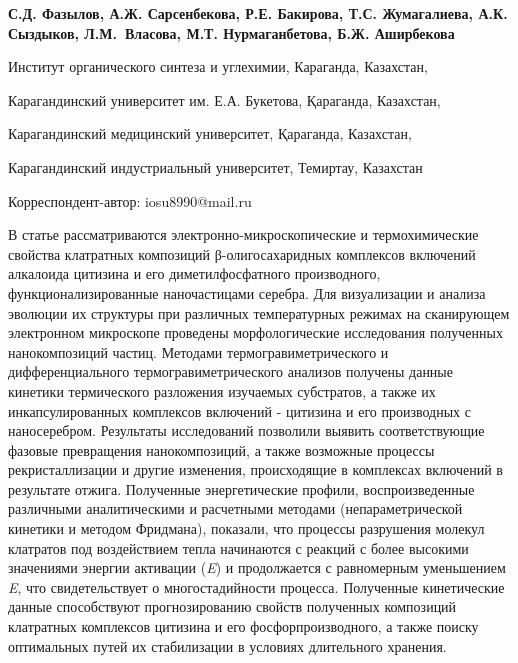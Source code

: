 
\begin{header}

{\bfseries
{}С.Д. Фазылов\envelope,
А.Ж. Сарсенбекова,
Р.Е. Бакирова,
Т.С. Жумагалиева,
А.К. Сыздыков,
Л.М.~Власова,
М.Т. Нурмаганбетова,
Б.Ж. Аширбекова
}
\end{header}

\begin{affil}
Институт органического синтеза и углехимии, Караганда, Казахстан,

Карагандинский университет им. Е.А. Букетова, Қараганда, Казахстан,

Карагандинский медицинский университет, Қараганда, Казахстан,

Карагандинский индустриальный университет, Темиртау, Казахстан

\envelope Корреспондент-автор: iosu8990@mail.ru
\end{affil}

В статье рассматриваются электронно-микроскопические и термохимические
свойства клатратных композиций β-олигосахаридных комплексов включений
алкалоида цитизина и его диметилфосфатного производного,
функционализированные наночастицами серебра. Для визуализации и анализа
эволюции их структуры при различных температурных режимах на сканирующем
электронном микроскопе проведены морфологические исследования полученных
нанокомпозиций частиц. Методами термогравиметрического и
дифференциального термогравиметрического анализов получены данные
кинетики термического разложения изучаемых субстратов, а также их
инкапсулированных комплексов включений - цитизина и его производных с
наносеребром. Результаты исследований позволили выявить соответствующие
фазовые превращения нанокомпозиций, а также возможные процессы
рекристаллизации и другие изменения, происходящие в комплексах включений
в результате отжига. Полученные энергетические профили, воспроизведенные
различными аналитическими и расчетными методами (непараметрической
кинетики и методом Фридмана), показали, что процессы разрушения молекул
клатратов под воздействием тепла начинаются с реакций с более высокими
значениями энергии активации (\emph{E}) и продолжается
с равномерным уменьшением \emph{E}, что свидетельствует
о многостадийности процесса. Полученные кинетические данные способствуют
прогнозированию свойств полученных композиций клатратных комплексов
цитизина и его фосфорпроизводного, а также поиску оптимальных путей их
стабилизации в условиях длительного хранения.

